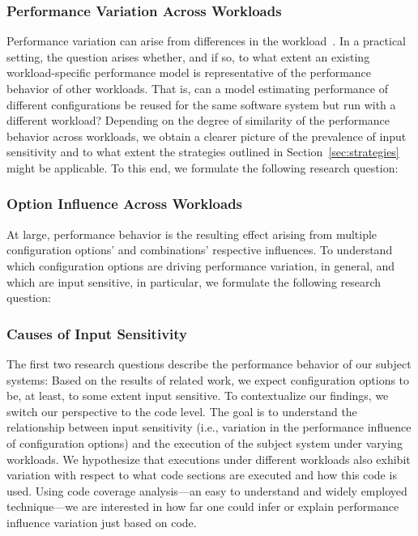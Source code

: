 \subsubsection{Performance Variation Across Workloads}
Performance variation can arise from differences in the workload~\cite{benchmarking_book}. In a practical setting, the question arises whether, and if so, to what extent an existing workload-specific performance model is representative of the performance behavior of other workloads. 
That is, can a model estimating performance of different configurations be reused for the same software system but run with a different workload? Depending on the degree of similarity of the performance behavior across workloads, we obtain a clearer picture of the prevalence of input sensitivity and to what extent the strategies outlined in  Section~\ref{sec:strategies} might be applicable.
To this end, we formulate the following research question: 

\subsubsection{Option Influence Across Workloads}
At large, performance behavior is the resulting effect arising from multiple configuration options’ and combinations’ respective influences. To understand which configuration options are driving performance variation, in general, and which are input sensitive, in particular, we formulate the following research question:

\subsubsection{Causes of Input Sensitivity}
The first two research questions describe the performance behavior of our subject systems: Based on the results of related work, we expect configuration options to be, at least, to some extent input sensitive. To contextualize our findings, we switch our perspective to the code level. The goal is to understand the relationship between input sensitivity (i.e., variation in the performance influence of configuration options) and the execution of the subject system under varying workloads. We hypothesize that executions under different workloads also exhibit variation with respect to what code sections are executed and how this code is used. Using code coverage analysis---an easy to understand and widely employed technique---we are interested in how far one could infer or explain performance influence variation just based on code. 

